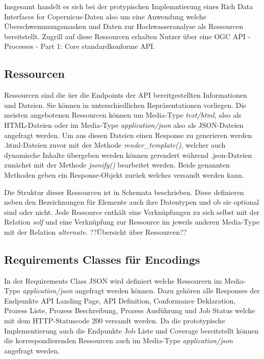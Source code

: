 Insgesamt handelt es sich bei der protypischen Implemntierung eines Rich Data Interfaces for Copernicus-Daten also um eine Anwendung welche Überschwemmungsmasken und Daten zur Hochwasseranalyse als Ressourcen bereitstellt.
Zugrill auf diese Ressourcen erhalten Nutzer über eine OGC API - Processes - Part 1: Core standardkonforme API. 

\subsection{Ressourcen}
Ressourcen sind die üer die Endpoints der API bereitgestellten Informationen und Dateien. Sie können in unterschiedlichen Repräsentationen vorliegen.
Die meisten angebotenen Ressourcen können um Media-Type \textit{text/html}, also als HTML-Dateien oder im Media-Type \textit{application/json} also als 
JSON-Dateien angefragt werden. Um aus diesen Dateien einen Response zu generieren werden .html-Dateien zuvor mit der Methode \textit{render\_template()}, welcher auch 
dynamische Inhalte übergeben werden können gerendert während .json-Dateien zunächst mit der Methode \textit{jsonify()} bearbeitet werden. Beide genannten Methoden
geben ein Response-Objekt zurück welches versandt werden kann.  

Die Struktur dieser Ressourcen ist in Schemata beschrieben. Diese definieren neben den Bezeichnungen für Elemente auch ihre Datentypen und 
ob sie optional sind oder nicht. Jede Ressource enthält eine Verknüpfungen zu sich selbst mit der Relation \textit{self} und eine Verknüpfung 
zur Ressource im jeweils anderen Media-Type mit der Relation \textit{alternate}. ??Übersicht über Ressourcen??

\subsection{Requirements Classes für Encodings}
In der Requirements Class JSON wird definiert welche Ressourcen im Media-Type \textit{application/json} angefragt werden können. Dazu gehören alle Responses der 
Endpunkte API Landing Page, API Definition, Conformance Deklaration, Prozess Liste, Prozess Beschreibung, Prozess Ausführung und Job Status welche mit dem 
HTTP-Statuscode 200 versandt werden. Da die prototypische Implementierung auch die Endpunkte Job Liste und Coverage bereitstellt können die korrespondierenden
Ressourcen auch im Media-Type \textit{application/json} angefragt werden.\\

